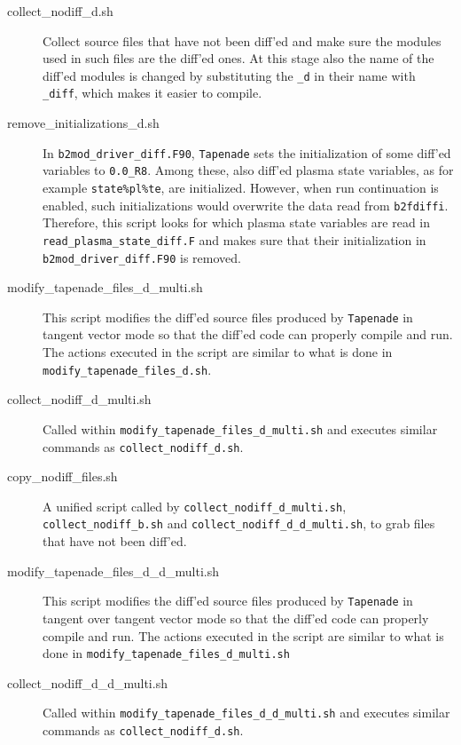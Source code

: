 \begin{sloppypar}
\begin{description}
  \item[collect\_nodiff\_d.sh] Collect source files that have not been diff'ed and make sure the modules used in such files are the diff'ed ones. At this stage also the name of the diff'ed modules is changed by substituting the {\tt \_d} in their name with {\tt \_diff}, which makes it easier to compile.

  \item[remove\_initializations\_d.sh] In {\tt b2mod\_driver\_diff.F90}, {\tt Tapenade} sets the initialization of some diff'ed variables to {\tt 0.0\_R8}. Among these, also diff'ed plasma state variables, as for example {\tt state\%pl\%te}, are initialized. However, when run continuation is enabled, such initializations would overwrite the data read from {\tt b2fdiffi}. Therefore, this script looks for which plasma state variables are read in {\tt read\_plasma\_state\_diff.F} and makes sure that their initialization in {\tt b2mod\_driver\_diff.F90} is removed.

  \item[modify\_tapenade\_files\_d\_multi.sh] This script modifies the diff'ed source files produced by {\tt Tapenade} in tangent vector mode so that the diff'ed code can properly compile and run. The actions executed in the script are similar to what is done in {\tt modify\_tapenade\_files\_d.sh}.

  \item[collect\_nodiff\_d\_multi.sh] Called within {\tt modify\_tapenade\_files\_d\_multi.sh} and executes similar commands as {\tt collect\_nodiff\_d.sh}.

  \item[copy\_nodiff\_files.sh] A unified script called by {\tt collect\_nodiff\_d\_multi.sh}, {\tt collect\_nodiff\_b.sh} and {\tt collect\_nodiff\_d\_d\_multi.sh}, to grab files that have not been diff'ed.

  \item[modify\_tapenade\_files\_d\_d\_multi.sh] This script modifies the diff'ed source files produced by {\tt Tapenade} in tangent over tangent vector mode so that the diff'ed code can properly compile and run. The actions executed in the script are similar to what is done in {\tt modify\_tapenade\_files\_d\_multi.sh}

  \item[collect\_nodiff\_d\_d\_multi.sh] Called within {\tt modify\_tapenade\_files\_d\_d\_multi.sh} and executes similar commands as {\tt collect\_nodiff\_d.sh}.


\end{description}
\end{sloppypar}

